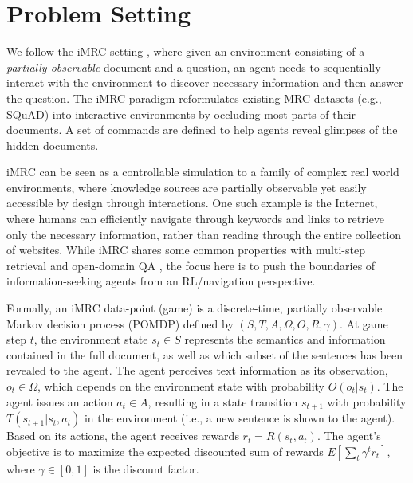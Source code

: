 \documentclass[11pt]{article}
\newcommand{\imrc}{iMRC\xspace}
\newcommand{\squad}{SQuAD\xspace}
\begin{document}
\section{Problem Setting}
\label{section:problem_setting}

We follow the \imrc setting \citep{yuan2020imrc}, where given an environment consisting of a \emph{partially observable} document and a question, an agent needs to sequentially interact with the environment to discover necessary information and then answer the question. 
The \imrc paradigm reformulates existing MRC datasets (e.g., \squad) into interactive environments by occluding most parts of their documents.
A set of commands are defined to help agents reveal glimpses of the hidden documents.

\imrc can be seen as a controllable simulation to a family of complex real world environments, where knowledge sources are partially observable yet easily accessible by design through interactions.
One such example is the Internet, where humans can efficiently navigate through keywords and links to retrieve only the necessary information, rather than reading through the entire collection of websites.
While \imrc shares some common properties with multi-step retrieval \citep{yang18hotpot,zhao2021multi} and open-domain QA \citep{lewis2020question}, 
the focus here is to push the boundaries of information-seeking agents \citep{bachman16infoseeking} from an RL/navigation perspective.


Formally, an \imrc data-point (game) is a discrete-time, partially observable Markov decision process (POMDP) defined by $(S, T, A, \Omega, O, R, \gamma)$.
At game step $t$, the environment state $s_t \in S$ represents the semantics and information contained in the full document, as well as which subset of the sentences has been revealed to the agent.
The agent perceives text information as its observation, $o_t \in \Omega$, which depends on the environment state with probability $O(o_t|s_t)$. 
The agent issues an action $a_t \in A$, resulting in a state transition $s_{t+1}$ with probability $T(s_{t+1} | s_t, a_t)$ in the environment (i.e., a new sentence is shown to the agent).
Based on its actions, the agent receives rewards $r_t = R(s_t, a_t)$. 
The agent's objective is to maximize the expected discounted sum of rewards $E \left[\sum_t \gamma^t r_t \right]$, where $\gamma \in [0, 1]$ is the discount factor.
\end{document}
